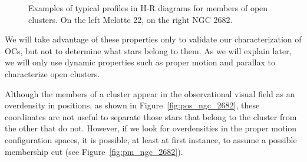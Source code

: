 \documentclass[11pt, a4paper, english]{book}
\begin{document}
\begin{figure}[htbp]
\begin{subfigure}{0.9\textwidth}
\begin{subfigure}[t]{0.45\textwidth}
    \end{subfigure}
  \end{subfigure}
  \caption{Examples of typical profiles in H-R diagrams for members of open clusters. On the left Melotte 22, on the right NGC 2682.}
  \label{fig:examples_of_hr_diagrams}
\end{figure}

We will take advantage of these properties only to validate our characterization of OCs,
but not to determine what stars belong to them. As we will explain later,
we will only use dynamic properties such as proper motion and parallax to characterize open clusters.

Although the members of a cluster appear in the observational visual field as an overdensity in positions,
as shown in Figure~\ref{fig:pos_ngc_2682},
these coordinates are not useful to separate those stars that belong to the cluster from the other that do not.
However, if we look for overdensities in the proper motion configuration spaces, it is possible, at least at first instance,
to assume a possible membership cut (see Figure~\ref{fig:pm_ngc_2682}).
\end{document}
